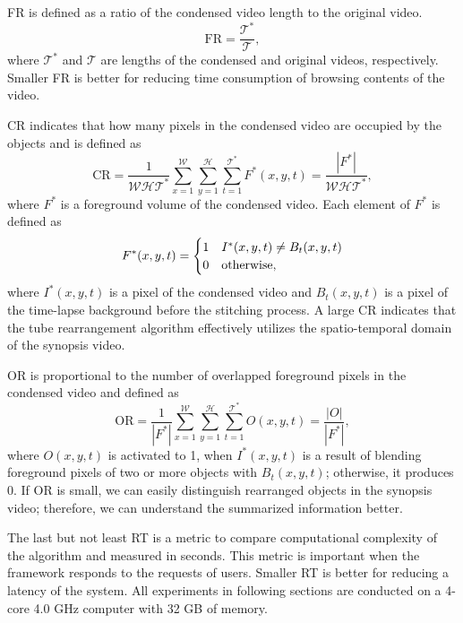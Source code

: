 \documentclass[11pt]{hyu_thesis}
\begin{document}
FR is defined as a ratio of the condensed video length to the original video.
\begin{equation}
\textrm{FR} = \frac{\mathcal{T}^{*}}{\mathcal{T}},
\end{equation}
where $\mathcal{T}^{*}$ and $\mathcal{T}$ are lengths of the condensed and original videos, respectively. Smaller FR is better for reducing time consumption of browsing contents of the video.

CR indicates that how many pixels in the condensed video are occupied by the objects and is defined as
\begin{equation}
\label{eq:CR}
\textrm{CR}=\frac{1}{\mathcal{W}\mathcal{H}\mathcal{T}^{*}}\sum_{x=1}^{\mathcal{W}}\sum_{y=1}^{\mathcal{H}}\sum_{t=1}^{\mathcal{T}^{*}} F^{*}(x,y,t) = \frac{|F^{*}|}{\mathcal{W}\mathcal{H}\mathcal{T}^{*}},
\end{equation}
where $F^{*}$ is a foreground volume of the condensed video. Each element of $F^{*}$ is defined as
\begin{equation}
F^{*}(x,y,t)=
\begin{cases}
1 & I^{*}(x,y,t) \neq B_t(x,y,t)\\
0 & \rm{otherwise},
\end{cases}
\end{equation}
where $I^{*}(x,y,t)$ is a pixel of the condensed video and $B_t(x,y,t)$ is a pixel of the time-lapse background before the stitching process. A large CR indicates that the tube rearrangement algorithm effectively utilizes the spatio-temporal domain of the synopsis video.

OR is proportional to the number of overlapped foreground pixels in the condensed video and defined as
\begin{equation}
\textrm{OR}=\frac{1}{|F^{*}|}\sum_{x=1}^{\mathcal{W}}\sum_{y=1}^{\mathcal{H}}\sum_{t=1}^{\mathcal{T}^{*}} O(x,y,t)=\frac{|O|}{|F^{*}|},
\end{equation}
where $O(x,y,t)$ is activated to 1, when $I^{*}(x,y,t)$ is a result of blending foreground pixels of two or more objects with $B_t(x,y,t)$; otherwise, it produces 0. If OR is small, we can easily distinguish rearranged objects in the synopsis video; therefore, we can understand the summarized information better.

The last but not least RT is a metric to compare computational complexity of the algorithm and measured in seconds. This metric is important when the framework responds to the requests of users. Smaller RT is better for reducing a latency of the system. All experiments in following sections are conducted on a 4-core 4.0 GHz computer with 32 GB of memory. 
\end{document}

